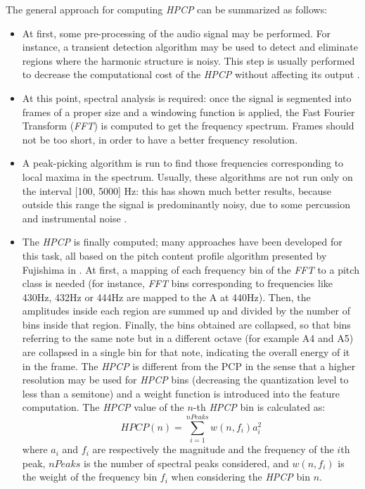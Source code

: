 The general approach for computing \textit{HPCP} can be summarized as follows:
\begin{itemize}
\item At first, some pre-processing of the audio signal may be performed. For instance, a transient detection algorithm may be used to detect and eliminate regions where the harmonic structure is noisy. This step is usually performed to decrease the computational cost of the \textit{HPCP} without affecting its output \cite{bonada00}.
\item At this point, spectral analysis is required: once the signal is segmented into frames of a proper size and a windowing function is applied, the Fast Fourier Transform (\textit{FFT}) is computed to get the frequency spectrum. Frames should not be too short, in order to have a better frequency resolution. 
\item A peak-picking algorithm is run to find those frequencies corresponding to local maxima in the spectrum. Usually, these algorithms are not run only on the interval [100, 5000] Hz: this has shown much better results, because outside this range the signal is predominantly noisy, due to some percussion and instrumental noise \cite{gomez06}.
\item The \textit{HPCP} is finally computed; many approaches have been developed for this task, all based on the pitch content profile algorithm presented by Fujishima in \cite{fujishima99}. At first, a mapping of each frequency bin of the \textit{FFT} to a pitch class is needed (for instance, \textit{FFT} bins corresponding to frequencies like 430Hz, 432Hz or 444Hz are mapped to the A at 440Hz). Then, the amplitudes inside each region are summed up and divided by the number of bins inside that region. Finally, the bins obtained are collapsed, so that bins referring to the same note but in a different octave (for example A4 and A5) are collapsed in a single bin for that note, indicating the overall energy of it in the frame. The \textit{HPCP} is different from the PCP in the sense that a higher resolution may be used for \textit{HPCP} bins (decreasing the quantization level to less than a semitone) and a weight function is introduced into the feature computation. The \textit{HPCP} value of the $n$-th \textit{HPCP} bin is calculated as:
\begin{equation}
HPCP(n) = \sum\limits_{i=1}^{nPeaks} w(n, f_i)a_i^2
\end{equation}
where $a_i$ and $f_i$ are respectively the magnitude and the frequency of the $i$th peak, $nPeaks$ is the number of spectral peaks considered, and $w(n, f_i)$ is the weight of the frequency bin $f_i$ when considering the \textit{HPCP} bin $n$.

\end{itemize}
